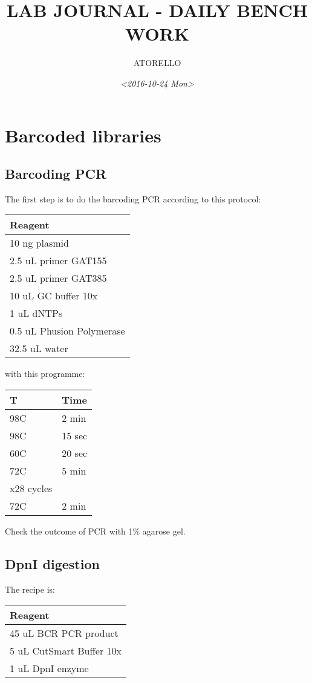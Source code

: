 \documentclass[11pt]{article}
\author{ATORELLO}
\date{\textit{<2016-10-24 Mon>}}
\title{LAB JOURNAL - DAILY BENCH WORK}
\begin{document}
\maketitle
\tableofcontents

\section{Barcoded libraries}
\label{sec:orgd4745f1}
\subsection{Barcoding PCR}
\label{sec:org4b6e281}
The first step is to do the barcoding PCR according to this protocol:\\
\begin{center}
\begin{tabular}{l}
\hline
Reagent\\
\hline
10 ng plasmid\\
2.5 uL primer GAT155\\
2.5 uL primer GAT385\\
10 uL GC buffer 10x\\
1 uL dNTPs\\
0.5 uL Phusion Polymerase\\
32.5 uL water\\
\hline
\end{tabular}
\end{center}

with this programme:\\
\begin{center}
\begin{tabular}{ll}
\hline
T & Time\\
\hline
98C & 2 min\\
98C & 15 sec\\
60C & 20 sec\\
72C & 5 min\\
x28 cycles & \\
72C & 2 min\\
\hline
\end{tabular}
\end{center}

Check the outcome of PCR with 1\% agarose gel.\\

\subsection{DpnI digestion}
\label{sec:orgd47708b}
The recipe is:\\
\begin{center}
\begin{tabular}{l}
\hline
Reagent\\
\hline
45 uL BCR PCR product\\
5 uL CutSmart Buffer 10x\\
1 uL DpnI enzyme\\
\hline
\end{tabular}
\end{center}
\end{document}
